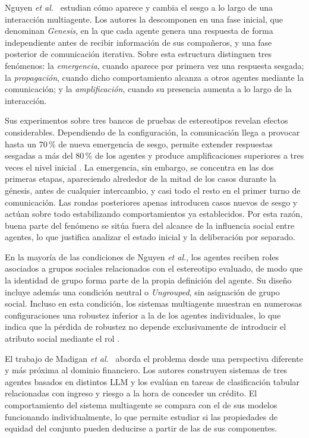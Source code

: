 Nguyen \textit{et al.}~\cite{nguyen2025social} estudian cómo aparece y cambia el sesgo a lo largo de una interacción multiagente. Los autores la descomponen en una fase inicial, que denominan \textit{Genesis}, en la que cada agente genera una respuesta de forma independiente antes de recibir información de sus compañeros, y una fase posterior de comunicación iterativa. Sobre esta estructura distinguen tres fenómenos: la \textit{emergencia}, cuando aparece por primera vez una respuesta sesgada; la \textit{propagación}, cuando dicho comportamiento alcanza a otros agentes mediante la comunicación; y la \textit{amplificación}, cuando su presencia aumenta a lo largo de la interacción.

Sus experimentos sobre tres bancos de pruebas de estereotipos revelan efectos considerables. Dependiendo de la configuración, la comunicación llega a provocar hasta un 70\,\% de nueva emergencia de sesgo, permite extender respuestas sesgadas a más del 80\,\% de los agentes y produce amplificaciones superiores a tres veces el nivel inicial \cite{nguyen2025social}. La emergencia, sin embargo, se concentra en las dos primeras etapas, apareciendo alrededor de la mitad de los casos durante la génesis, antes de cualquier intercambio, y casi todo el resto en el primer turno de comunicación. Las rondas posteriores apenas introducen casos nuevos de sesgo y actúan sobre todo estabilizando comportamientos ya establecidos. Por esta razón, buena parte del fenómeno se sitúa fuera del alcance de la influencia social entre agentes, lo que justifica analizar el estado inicial y la deliberación por separado.

En la mayoría de las condiciones de Nguyen \textit{et al.}, los agentes reciben roles asociados a grupos sociales relacionados con el estereotipo evaluado, de modo que la identidad de grupo forma parte de la propia definición del agente. Su diseño incluye además una condición neutral o \textit{Ungrouped}, sin asignación de grupo social. Incluso en esta condición, los sistemas multiagente muestran en numerosas configuraciones una robustez inferior a la de los agentes individuales, lo que indica que la pérdida de robustez no depende exclusivamente de introducir el atributo social mediante el rol \cite{nguyen2025social}.

El trabajo de Madigan \textit{et al.}~\cite{madigan2025emergent} aborda el problema desde una perspectiva diferente y más próxima al dominio financiero. Los autores construyen sistemas de tres agentes basados en distintos LLM y los evalúan en tareas de clasificación tabular relacionadas con ingreso y riesgo a la hora de conceder un crédito. El comportamiento del sistema multiagente se compara con el de sus modelos funcionando individualmente, lo que permite estudiar si las propiedades de equidad del conjunto pueden deducirse a partir de las de sus componentes.

